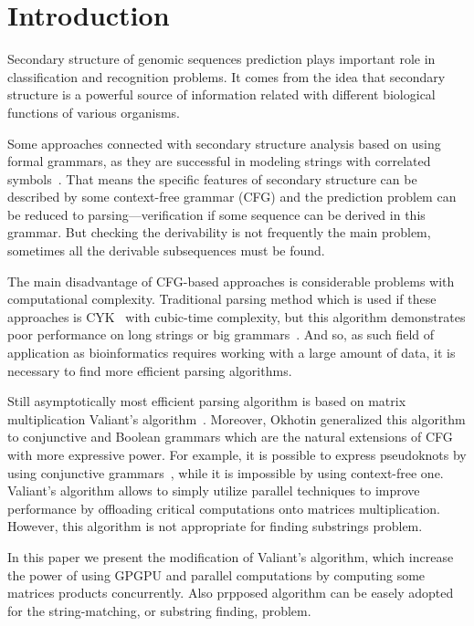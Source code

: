 \section{\bf Introduction}

Secondary structure of genomic sequences prediction plays important role in classification and recognition problems. It comes from the idea that secondary structure is a powerful source of information  related with different biological functions of various organisms.

Some approaches connected with secondary structure analysis based on using formal grammars, as they are successful in modeling strings with correlated symbols~\cite{!!!}.
That means the specific features of secondary structure can be described by some context-free grammar (CFG) and the prediction problem can be reduced to parsing---verification if some sequence can be derived in this grammar.
But checking the derivability is not frequently the main problem, sometimes all the derivable subsequences must be found.

The main disadvantage of CFG-based approaches is considerable problems with computational complexity.
Traditional parsing method which is used if these approaches is CYK~\cite{Kas, Younger:1966:CLP:1441427.1442019} with cubic-time complexity, but this algorithm demonstrates poor performance on long strings or big grammars~\cite{!!!}.
And so, as such field of application as bioinformatics requires working with a large amount of data, it is necessary to find more efficient parsing algorithms.

Still asymptotically most efficient parsing algorithm is based on matrix multiplication Valiant's algorithm~\cite{Valiant:1975:GCR:1739932.1740048}.
Moreover, Okhotin generalized this algorithm to conjunctive and Boolean grammars which are the natural extensions of CFG with more expressive power.
For example, it is possible to express pseudoknots by using conjunctive grammars~\cite{!!!}, while it is impossible by using context-free one.
Valiant’s algorithm allows to simply utilize parallel techniques to improve performance by offloading critical computations onto matrices multiplication.
However, this algorithm is not appropriate for finding substrings problem.

In this paper we present the modification of Valiant's algorithm, which increase the power of using GPGPU and parallel computations by computing some matrices products concurrently.
Also prpposed algorithm can be easely adopted for the string-matching, or substring finding, problem.
